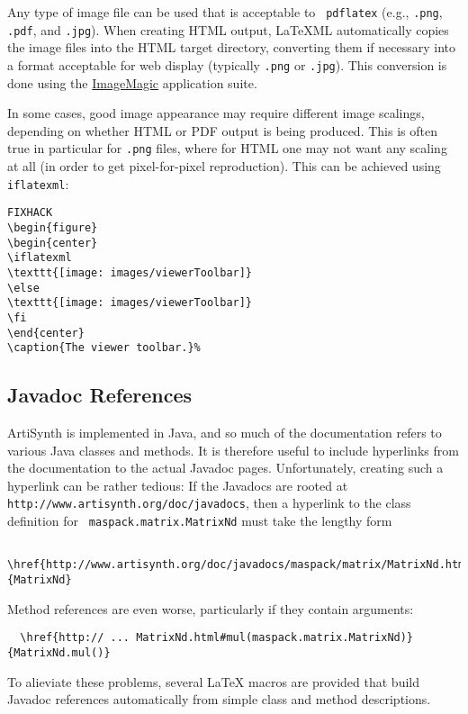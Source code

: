 \documentclass{article}
\begin{document}
Any type of image file can be used that is acceptable to {\tt
pdflatex} (e.g., {\tt .png}, {\tt .pdf}, and {\tt .jpg}). When creating
HTML output, LaTeXML automatically copies the image files into the
HTML target directory, converting them if necessary into a format
acceptable for web display (typically {\tt .png} or {\tt .jpg}). This
conversion is done using the
\href{http://www.imagemagick.org}{ImageMagic} application suite.

In some cases, good image appearance may require different image
scalings, depending on whether HTML or PDF output is being
produced. This is often true in particular for {\tt .png} files, where
for HTML one may not want any scaling at all (in order to get
pixel-for-pixel reproduction). This can be achieved using
{\tt \BKS iflatexml}:

\begin{lstlisting}FIXHACK
\begin{figure}
\begin{center}
\iflatexml
\texttt{[image: images/viewerToolbar]}
\else
\texttt{[image: images/viewerToolbar]}
\fi
\end{center}
\caption{The viewer toolbar.}%
\end{lstlisting}

\subsection{Javadoc References}
\label{JavadocRefsSec}

ArtiSynth is implemented in Java, and so much of the documentation
refers to various Java classes and methods. It is therefore useful to
include hyperlinks from the documentation to the actual Javadoc pages.
Unfortunately, creating such a hyperlink can be rather tedious: If the
Javadocs are rooted at {\tt http://www.artisynth.org/doc/javadocs},
then a hyperlink to the class definition for {\tt
maspack.matrix.MatrixNd} must take the lengthy form
\begin{verbatim}
  \href{http://www.artisynth.org/doc/javadocs/maspack/matrix/MatrixNd.html}{MatrixNd}
\end{verbatim}
Method references are even worse, particularly if they contain arguments:
\begin{verbatim}
  \href{http:// ... MatrixNd.html#mul(maspack.matrix.MatrixNd)}{MatrixNd.mul()}
\end{verbatim}
To alieviate these problems, several LaTeX macros are provided that
build Javadoc references automatically from simple class and
method descriptions.
\end{document}
